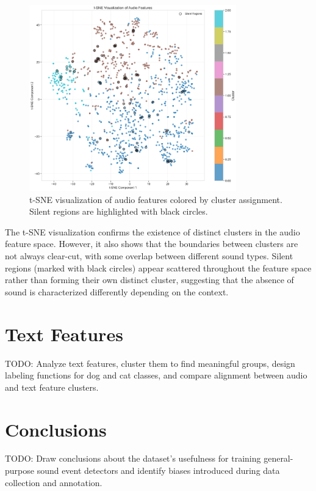 \documentclass{article}
\begin{document}
\begin{figure}[ht]
  \centering
  \includegraphics[width=0.8\textwidth]{figures/audio_features/tsne_visualization.png}
  \caption{t-SNE visualization of audio features colored by cluster assignment. Silent regions are highlighted with black circles.}
  \label{fig:tsne}
\end{figure}

The t-SNE visualization confirms the existence of distinct clusters in the audio feature space. However, it also shows that the boundaries between clusters are not always clear-cut, with some overlap between different sound types. Silent regions (marked with black circles) appear scattered throughout the feature space rather than forming their own distinct cluster, suggesting that the absence of sound is characterized differently depending on the context.

\section{Text Features}
\label{sec:text_features}

TODO: Analyze text features, cluster them to find meaningful groups, design labeling functions for dog and cat classes, and compare alignment between audio and text feature clusters.

\section{Conclusions}
\label{sec:conclusions}

TODO: Draw conclusions about the dataset's usefulness for training general-purpose sound event detectors and identify biases introduced during data collection and annotation.
\end{document}
